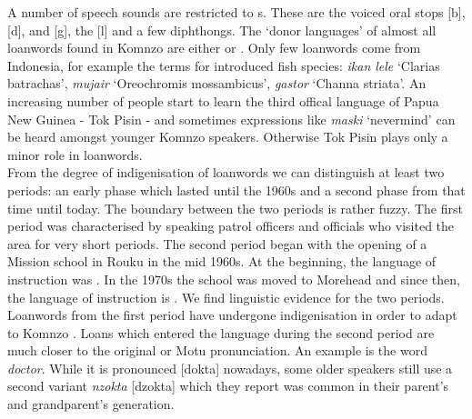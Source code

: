A number of speech sounds are restricted to s. These are the voiced oral stops [b], [d], and [g], the   [l] and a few diphthongs. The `donor languages' of almost all loanwords found in Komnzo are either  or . Only few loanwords come from  Indonesia, for example the terms for introduced fish species: \emph{ikan lele} `Clarias batrachas', \emph{mujair} `Oreochromis mossambicus', \emph{gastor} `Channa striata'. An increasing number of people start to learn the third offical language of Papua New Guinea - Tok Pisin - and sometimes expressions like \emph{maski} `nevermind' can be heard amongst younger Komnzo speakers. Otherwise Tok Pisin plays only a minor role in loanwords.\\

From the degree of indigenisation of loanwords we can distinguish at least two periods: an early phase which lasted until the 1960s and a second phase from that time until today. The boundary between the two periods is rather fuzzy. The first period was characterised by  speaking patrol officers and officials who visited the area for very short periods. The second period began with the opening of a Mission school in Rouku in the mid 1960s. At the beginning, the language of instruction was . In the 1970s the school was moved to Morehead and since then, the language of instruction is . We find linguistic evidence for the two periods. Loanwords from the first period have undergone indigenisation in order to adapt to Komnzo . Loans which entered the language during the second period are much closer to the original  or Motu pronunciation. An example is the word \emph{doctor}. While it is pronounced [dokta] nowadays, some older speakers still use a second variant \emph{nzokta} [dzokta] which they report was common in their parent's and grandparent's generation.\\

